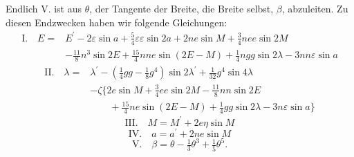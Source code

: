\par\noindent\hspace*{\parindent}Endlich V. ist aus \(\theta\), der Tangente der Breite, die Breite selbst, \(\beta\),
abzuleiten. Zu diesen Endzwecken haben wir folgende Gleichungen:
\[
\begin{aligned}
\text{I.}\quad E={}&E^{\prime}-2\varepsilon\sin a+\tfrac54\varepsilon\varepsilon\sin2a
 +2ne\sin M+\tfrac34nee\sin2M\\
&-\tfrac{11}{8}n^3\sin2E+\tfrac{15}{4}nne\sin(2E-M)
 +\tfrac14ngg\sin2\lambda-3nn\varepsilon\sin a
\end{aligned}
\]
\[
\begin{aligned}
\text{II.}\quad\lambda={}&\lambda^{\prime}
 -\left(\tfrac14gg-\tfrac18g^4\right)\sin2\lambda^{\prime}
 +\tfrac{1}{32}g^4\sin4\lambda\\
&-\zeta\bigl\{2e\sin M+\tfrac34ee\sin2M-\tfrac{11}{8}nn\sin2E\\
&\qquad+\tfrac{15}{4}ne\sin(2E-M)+\tfrac14gg\sin2\lambda-3n\varepsilon\sin a\bigr\}
\end{aligned}
\]
\[
\text{III.}\quad M=M^{\prime}+2e\eta\sin M
\]
\[
\text{IV.}\quad a=a^{\prime}+2ne\sin M
\]
\[
\text{V.}\quad\beta=\theta-\tfrac13\theta^3+\tfrac15\theta^5.
\]
\clearpage
\endgroup
